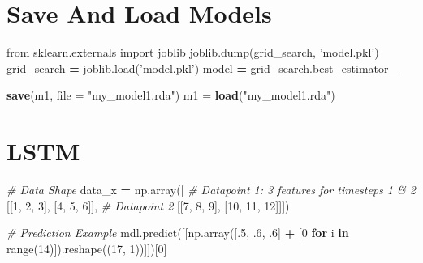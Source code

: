 \documentclass[]{book}
\newenvironment{Shaded}{\begin{snugshade}}{\end{snugshade}}
\newcommand{\BuiltInTok}[1]{#1}
\newcommand{\CommentTok}[1]{\textcolor[rgb]{0.56,0.35,0.01}{\textit{#1}}}
\newcommand{\ControlFlowTok}[1]{\textcolor[rgb]{0.13,0.29,0.53}{\textbf{#1}}}
\newcommand{\DataTypeTok}[1]{\textcolor[rgb]{0.13,0.29,0.53}{#1}}
\newcommand{\DecValTok}[1]{\textcolor[rgb]{0.00,0.00,0.81}{#1}}
\newcommand{\FloatTok}[1]{\textcolor[rgb]{0.00,0.00,0.81}{#1}}
\newcommand{\ImportTok}[1]{#1}
\newcommand{\KeywordTok}[1]{\textcolor[rgb]{0.13,0.29,0.53}{\textbf{#1}}}
\newcommand{\NormalTok}[1]{#1}
\newcommand{\OperatorTok}[1]{\textcolor[rgb]{0.81,0.36,0.00}{\textbf{#1}}}
\newcommand{\StringTok}[1]{\textcolor[rgb]{0.31,0.60,0.02}{#1}}
\begin{document}
\hypertarget{save-and-load-models}{%
\section{Save And Load Models}\label{save-and-load-models}}

\begin{Shaded}
\begin{Highlighting}[]
\ImportTok{from}\NormalTok{ sklearn.externals }\ImportTok{import}\NormalTok{ joblib}
\NormalTok{joblib.dump(grid_search, }\StringTok{'model.pkl'}\NormalTok{)}
\NormalTok{grid_search }\OperatorTok{=}\NormalTok{ joblib.load(}\StringTok{'model.pkl'}\NormalTok{)}
\NormalTok{model }\OperatorTok{=}\NormalTok{ grid_search.best_estimator_}
\end{Highlighting}
\end{Shaded}

\begin{Shaded}
\begin{Highlighting}[]
\KeywordTok{save}\NormalTok{(m1, }\DataTypeTok{file =} \StringTok{"my_model1.rda"}\NormalTok{)}
\NormalTok{m1 =}\StringTok{ }\KeywordTok{load}\NormalTok{(}\StringTok{"my_model1.rda"}\NormalTok{)}
\end{Highlighting}
\end{Shaded}

\hypertarget{lstm}{%
\section{LSTM}\label{lstm}}

\begin{Shaded}
\begin{Highlighting}[]
\CommentTok{# Data Shape}
\NormalTok{data_x }\OperatorTok{=}\NormalTok{ np.array([}
    \CommentTok{# Datapoint 1: 3 features for timesteps 1 & 2}
\NormalTok{    [[}\DecValTok{1}\NormalTok{, }\DecValTok{2}\NormalTok{, }\DecValTok{3}\NormalTok{], [}\DecValTok{4}\NormalTok{, }\DecValTok{5}\NormalTok{, }\DecValTok{6}\NormalTok{]],}
    \CommentTok{# Datapoint 2}
\NormalTok{    [[}\DecValTok{7}\NormalTok{, }\DecValTok{8}\NormalTok{, }\DecValTok{9}\NormalTok{], [}\DecValTok{10}\NormalTok{, }\DecValTok{11}\NormalTok{, }\DecValTok{12}\NormalTok{]]])}
\end{Highlighting}
\end{Shaded}

\begin{Shaded}
\begin{Highlighting}[]
\CommentTok{# Prediction Example}
\NormalTok{mdl.predict([[np.array([.}\DecValTok{5}\NormalTok{, }\FloatTok{.6}\NormalTok{, }\FloatTok{.6}\NormalTok{] }\OperatorTok{+}\NormalTok{ [}\DecValTok{0} \ControlFlowTok{for}\NormalTok{ i }\KeywordTok{in} \BuiltInTok{range}\NormalTok{(}\DecValTok{14}\NormalTok{)]).reshape((}\DecValTok{17}\NormalTok{, }\DecValTok{1}\NormalTok{))]])[}\DecValTok{0}\NormalTok{]}
\end{Highlighting}
\end{Shaded}
\end{document}
